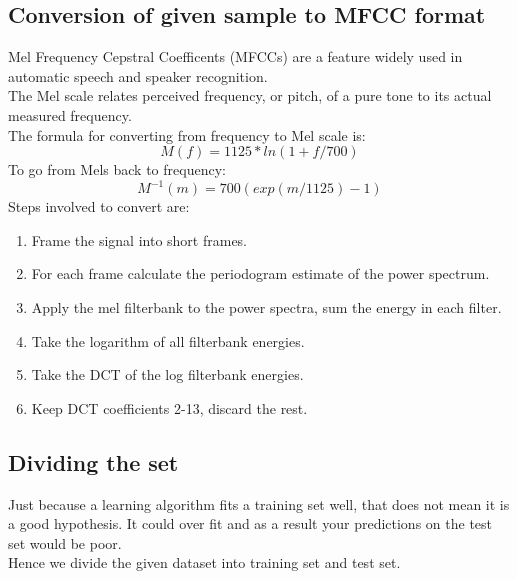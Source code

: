 \documentclass[12pt,letterpaper]{article}
\newcommand{\<}{\langle}
\renewcommand{\>}{\rangle}
\theoremstyle{definition}
\begin{document}
\subsection{Conversion of given sample to MFCC format}
Mel Frequency Cepstral Coefficents (MFCCs) are a feature widely used in automatic speech and speaker recognition.\\
The Mel scale relates perceived frequency, or pitch, of a pure tone to its actual measured frequency.\\The formula for converting from frequency to Mel scale is:
$$M(f)=1125*ln(1+f/700) $$To go from Mels back to frequency:\\
$$M^{-1}(m)=700(exp(m/1125)-1)$$ 
Steps involved to convert are:
\begin{enumerate}
	\item Frame the signal into short frames.
    \item For each frame calculate the periodogram estimate of the power spectrum.
    \item Apply the mel filterbank to the power spectra, sum the energy in each filter.
    \item Take the logarithm of all filterbank energies.
    \item Take the DCT of the log filterbank energies.
    \item Keep DCT coefficients 2-13, discard the rest.\\


\end{enumerate}

\subsection{Dividing the set}
Just because a learning algorithm fits a training set well, that does not mean it is a good hypothesis. It could over fit and as a result your predictions on the test set would be poor.\\
Hence we divide the given dataset into training set and test set.
\end{document}
